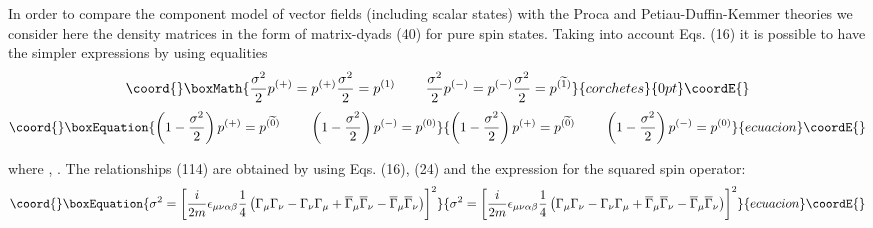 \documentclass[a4paper,12pt]{article}
\begin{document}
In order to compare the \coordHE{}component model of vector fields (including
scalar states) with the Proca and Petiau-Duffin-Kemmer theories we consider
here the density matrices in the form of matrix-dyads (40) for pure spin
states. Taking into account Eqs. (16) it is possible to have the simpler
expressions by using equalities
\[\coord{}\boxMath{
\frac{\sigma ^2}2p^{(+)}=p^{(+)}\frac{\sigma
^2}2=p^{(1)}\hspace{0.3in}\frac{ \sigma
^2}2p^{(-)}=p^{(-)}\frac{\sigma ^2}2=p^{(\widetilde{1})}
}{corchetes}{0pt}\coordE{}\]
\begin{equation}\coord{}\boxEquation{
\left( 1-\frac{\sigma ^2}2\right)
p^{(+)}=p^{(\widetilde{0})}\hspace{0.3in} \left( 1-\frac{\sigma
^2}2\right) p^{(-)}=p^{(0)}  \label{114}
}{
\left( 1-\frac{\sigma ^2}2\right)
p^{(+)}=p^{(\widetilde{0})}\hspace{0.3in} \left( 1-\frac{\sigma
^2}2\right) p^{(-)}=p^{(0)}  }{ecuacion}\coordE{}\end{equation}

where \coordHE{}  \coordHE{}  \coordHE{}, \coordHE{}. The relationships (114) are
obtained by using Eqs. (16), (24) and the expression for the
squared spin operator:
\begin{equation}\coord{}\boxEquation{
\sigma ^2=\left[ \frac i{2m}\epsilon _{\mu \nu \alpha \beta }\frac 14\left(
\Gamma _\mu \Gamma _\nu -\Gamma _\nu \Gamma _\mu +\overline{\Gamma }_\mu
\overline{\Gamma }_\nu -\overline{\Gamma }_\mu \overline{\Gamma }_\nu
\right) \right] ^2  \label{115}
}{
\sigma ^2=\left[ \frac i{2m}\epsilon _{\mu \nu \alpha \beta }\frac 14\left(
\Gamma _\mu \Gamma _\nu -\Gamma _\nu \Gamma _\mu +\overline{\Gamma }_\mu
\overline{\Gamma }_\nu -\overline{\Gamma }_\mu \overline{\Gamma }_\nu
\right) \right] ^2  }{ecuacion}\coordE{}\end{equation}
\end{document}
